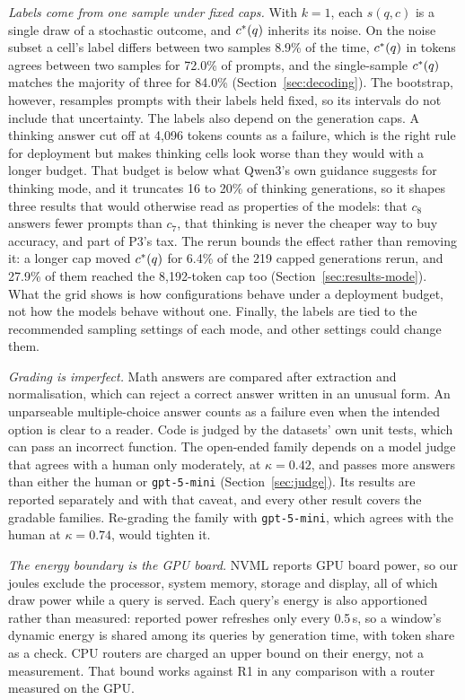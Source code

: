 \emph{Labels come from one sample under fixed caps.} With $k = 1$, each
$s(q, c)$ is a single draw of a stochastic outcome, and $c^{*}(q)$ inherits
its noise. On the noise subset a cell's label differs between two samples
8.9\% of the time, $c^{*}(q)$ in tokens agrees between two samples for
72.0\% of prompts, and the single-sample $c^{*}(q)$ matches the majority of
three for 84.0\% (Section~\ref{sec:decoding}). The bootstrap, however, resamples
prompts with their labels held fixed, so its intervals do not include that
uncertainty. The labels also depend on the generation caps. A thinking
answer cut off at 4{,}096 tokens counts as a failure, which is the right
rule for deployment but makes thinking cells look worse than they would with
a longer budget. That budget is below what Qwen3's own guidance suggests for
thinking mode, and it truncates 16 to 20\% of thinking generations, so it
shapes three results that would otherwise read as properties of the models:
that $c_8$ answers fewer prompts than $c_7$, that thinking is never the
cheaper way to buy accuracy, and part of P3's tax. The rerun bounds the
effect rather than removing it: a longer cap moved $c^{*}(q)$ for 6.4\% of
the 219 capped generations rerun, and 27.9\% of them reached the
8{,}192-token cap too (Section~\ref{sec:results-mode}). What the grid shows
is how configurations behave under a deployment budget, not how the models
behave without one. Finally, the labels are tied to the recommended sampling
settings of each mode, and other settings could change them.

\emph{Grading is imperfect.} Math answers are compared after extraction and
normalisation, which can reject a correct answer written in an unusual form.
An unparseable multiple-choice answer counts as a failure even when the
intended option is clear to a reader. Code is judged by the datasets' own
unit tests, which can pass an incorrect function. The open-ended family
depends on a model judge that agrees with a human only moderately, at
$\kappa = 0.42$, and passes more answers than either the human or
\texttt{gpt-5-mini} (Section~\ref{sec:judge}). Its results are reported
separately and with that caveat, and every other result covers the gradable
families. Re-grading the family with \texttt{gpt-5-mini}, which agrees with
the human at $\kappa = 0.74$, would tighten it.

\emph{The energy boundary is the GPU board.} NVML reports GPU board power,
so our joules exclude the processor, system memory, storage and display,
all of which draw power while a query is served. Each query's energy is
also apportioned rather than measured: reported power refreshes only every
0.5\,s, so a window's dynamic energy is shared among its queries by
generation time, with token share as a check. CPU routers are charged an
upper bound on their energy, not a measurement. That bound works against R1
in any comparison with a router measured on the GPU.


